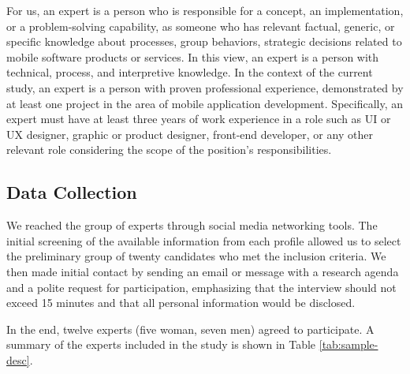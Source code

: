 \documentclass[preprint,12pt,number]{elsarticle}
\begin{document}
For us, an expert is a person who is responsible for a concept, an implementation, or a problem-solving capability, as someone who has relevant factual, generic, or specific knowledge about processes, group behaviors, strategic decisions related to mobile software products or services. 
In this view, an expert is a person with technical, process, and interpretive knowledge. In the context of the current study, an expert is a person with proven professional experience, demonstrated by at least one project in the area of mobile application development. Specifically, an expert must have at least three years of work experience in a role such as UI or UX designer, graphic or product designer, front-end developer, or any other relevant role considering the scope of the position's responsibilities. 

\subsection{Data Collection}
We reached the group of experts through social media networking tools. The initial screening of the available information from each profile allowed us to select the preliminary group of twenty candidates who met the inclusion criteria. We then made initial contact by sending an email or message with a research agenda and a polite request for participation, emphasizing that the interview should not exceed 15 minutes and that all personal information would be disclosed. 

In the end, twelve experts (five woman, seven men) agreed to participate. A summary of the experts included in the study is shown in Table \ref{tab:sample-desc}.
\end{document}
